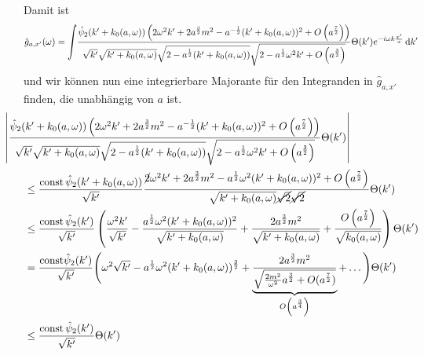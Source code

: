 Damit ist
\begin{equation}
    \hat g_{a,x'}(\omega) = \bigint \frac{
        \hat\psi_2(k'+k_0(a,\omega)) \left(
        2 \omega^2 k' + 2a^{\frac{3}{2}}m^2-a^{-\frac{1}{2}}(k'+k_0(a,\omega))^2
            + O \left(a^{\frac{7}{2}}\right)
        \right)
    }
    {
        \sqrt{k'} \sqrt{k'+k_0(a,\omega)} \sqrt{2-a^{\frac{1}{2}}(k'+k_0(a,\omega))}
        \sqrt{2-a^{\frac{1}{2}}\omega^2 k' + O\left(a^{\frac{3}{2}}\right)}
    }
    \Theta(k') e^{-i\omega k \frac{x'}{a}} \d k'
    \label{eq:ga(w)}
\end{equation}
und wir können nun eine integrierbare Majorante für den Integranden in \(\hat g_{a,x'}\) finden, die unabhängig von \(a\) ist.
\begin{align}
&\kern -2em
    \left|
    \frac{
        \hat\psi_2(k'+k_0(a,\omega)) \left(
        2 \omega^2 k' + 2a^{\frac{3}{2}}m^2-a^{-\frac{1}{2}}(k'+k_0(a,\omega))^2
            + O \left(a^{\frac{7}{2}}\right)
        \right)
    }
    {
        \sqrt{k'} \sqrt{k'+k_0(a,\omega)} \sqrt{2-a^{\frac{1}{2}}(k'+k_0(a,\omega))}
        \sqrt{2-a^{\frac{1}{2}}\omega^2 k' + O\left(a^{\frac{3}{2}}\right)}
    }
    \Theta(k')
    \right|
    \nonumber \\ &\leq
    \frac{\textrm{const}\,\hat\psi_2(k'+k_0(a,\omega))}{\sqrt{k'}}
    \frac{
        \cancel{2}\omega^2 k' + 2a^{\frac{3}{2}}m^2
        -a^{\frac{1}{2}} \omega^2 (k'+k_0(a,\omega))^2 + O\left(a^{\frac{7}{2}}\right)
    }
    {
        \sqrt{k' + k_0(a,\omega)}\cancel{\sqrt{2}} \cancel{\sqrt{2}}
    }\Theta(k')
    \nonumber \\ &\leq
    \frac{\textrm{const}\, \hat\psi_2(k')}{\sqrt{k'}}
    \left(
        \frac{\omega^2 k'}{\sqrt{k'}}
        - \frac{a^{\frac{1}{2}}\omega^2(k'+k_0(a,\omega))^2}{\sqrt{k'+k_0(a,\omega)}}
        + \frac{2a^{\frac{3}{2}}m^2}{\sqrt{k'+k_0(a,\omega)}}
        + \frac{O\left(a^{\frac{7}{2}}\right)}{\sqrt{k_0(a,\omega)}}
    \right)\Theta(k')
    \nonumber \\ &=
    \frac{\textrm{const} \hat\psi_2(k')}{\sqrt{k'}}
    \Bigg(
        \omega^2 \sqrt{k'} - a^{\frac{1}{2}}\omega^2 (k'+k_0(a,\omega))^{\frac{3}{2}}
        + \underbrace{\frac{2a^{\frac{3}{2}}m^2}
                    {\sqrt{\frac{2m^2}{\omega^2}a^{\frac{3}{2}}+O(a^{\frac{7}{2}})}}}_{O\left(a^{\frac{3}{4}}\right)}
        + \dots
    \Bigg)\Theta(k')
    \nonumber \\&\leq
    \frac{\textrm{const}\, \hat\psi_2(k')}{\sqrt{k'}}\Theta(k')
    \label{eq:lange_1/sqrt_abschaetzerei}
\end{align}
